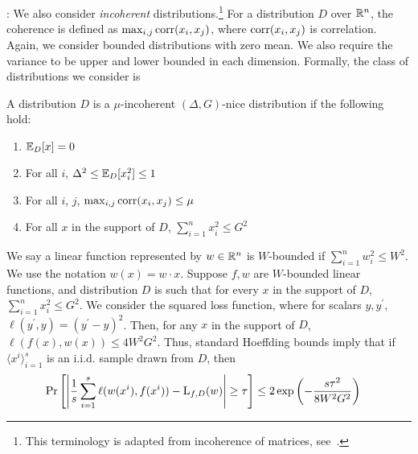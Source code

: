 : We also consider \emph{incoherent}
distributions.\footnote{This terminology is adapted from incoherence of
matrices, \eg see~\cite{Donoho:2009-sparse}.}
For a distribution $D$ over $\mathbb{R}^n$, the coherence is defined as
$\max_{i, j} \mathrm{corr}(x_i, x_j)$, where $\mathrm{corr}(x_i, x_j)$ is correlation. Again, we
consider bounded distributions with zero mean. We also require the variance to
be upper and lower bounded in each dimension. Formally, the class of
distributions we consider is

\begin{definition}
\label{defn:bhutan} A distribution $D$ is a $\mu$-incoherent $(\Delta, G)$-nice
distribution if the following hold:
\begin{enumerate}
\item $\mathbb{E}_D[x] = 0$
\item For all $i$, $\Delta^2 \leq \mathbb{E}_D[x_i^2] \leq 1$
\item For all $i$, $j$, $\max_{i, j} \mathrm{corr}(x_i, x_j) \leq \mu$
\item For all $x$ in the support of $D$, $\sum_{i=1}^n x_i^2 \leq G^2$
\end{enumerate}
\end{definition}


We say a linear function represented by $w \in \mathbb{R}^n$ is $W$-bounded if
$\sum_{i=1}^n w_i^2 \leq W^2$. We use the notation $w(x) = w \cdot x$. Suppose
$f, w$ are $W$-bounded linear functions, and distribution $D$ is such that for every
$x$ in the support of $D$, $\sum_{i=1}^n x_i^2 \leq G^2$.  We consider the
squared loss function, where for scalars $y, y^\prime$, $\ell(y^\prime, y) =
(y^\prime - y)^2$.  Then, for any $x$ in the support of $D$, $\ell(f(x), w(x))
\leq 4 W^2G^2$. Thus, standard Hoeffding bounds imply that
if $\langle x^i \rangle_{i=1}^s$ is an i.i.d. sample drawn from $D$, then
\begin{align}
\Pr\left[\left| \frac{1}{s} \sum_{i=1}^s \ell(w(x^i), f(x^i)) - \mathrm{L}_{f, D}(w)
\right| \geq \tau \right] &\leq 2 \exp\left( -\frac{ s \tau^2}{8W^2G^2}\right)
\label{eqn:concentration}
\end{align}

